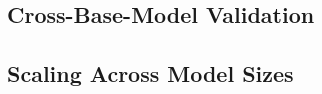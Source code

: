 \documentclass{article}
\begin{document}


%
%
%
\subsection{Cross-Base-Model Validation}
\label{sec:exp:crossbase}



%
\subsection{Scaling Across Model Sizes}
\label{sec:exp:scaling}



\end{document}
